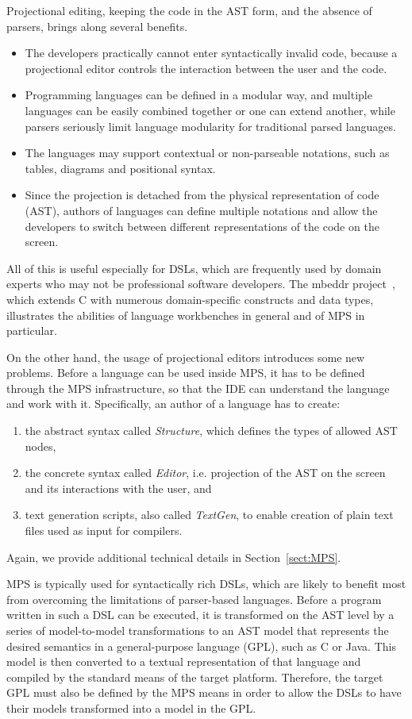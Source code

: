 Projectional editing, keeping the code in the AST form, and the absence of parsers, brings along several benefits.
\begin{itemize}
	\item The developers practically cannot enter syntactically invalid code, because a projectional editor controls the interaction between the user and the code.
	\item Programming languages can be defined in a modular way, and multiple languages can be easily combined together or one can extend another, while parsers seriously limit language modularity for traditional parsed languages.
	\item The languages may support contextual or non-parseable notations, such as tables, diagrams and positional syntax.
	\item Since the projection is detached from the physical representation of code (AST), authors of languages can define multiple notations and allow the developers to switch between different representations of the code on the screen.
\end{itemize}
All of this is useful especially for DSLs, which are frequently used by domain experts who may not be professional software developers.
The mbeddr project~\cite{ref:MBEDDR}, which extends C with numerous domain-specific constructs and data types, illustrates the abilities of language workbenches in general and of MPS in particular.

On the other hand, the usage of projectional editors introduces some new problems.
Before a language can be used inside MPS, it has to be defined through the MPS infrastructure, so that the IDE can understand the language and work with it.
Specifically, an author of a language has to create:
\begin{enumerate}
	\item the abstract syntax called \emph{Structure}, which defines the types of allowed AST nodes,
	\item the concrete syntax called \emph{Editor}, i.e. projection of the AST on the screen and its interactions with the user, and
	\item text generation scripts, also called \emph{TextGen}, to enable creation of plain text files used as input for compilers.
\end{enumerate}	
Again, we provide additional technical details in Section~\ref{sect:MPS}.

MPS is typically used for syntactically rich DSLs, which are likely to benefit most from overcoming the limitations of parser-based languages.
Before a program written in such a DSL can be executed, it is transformed on the AST level by a series of model-to-model transformations to an AST model that represents the desired semantics in a general-purpose language (GPL), such as C or Java.
This model is then converted to a textual representation of that language and compiled by the standard means of the target platform.
Therefore, the target GPL must also be defined by the MPS means in order to allow the DSLs to have their models transformed into a model in the GPL.

